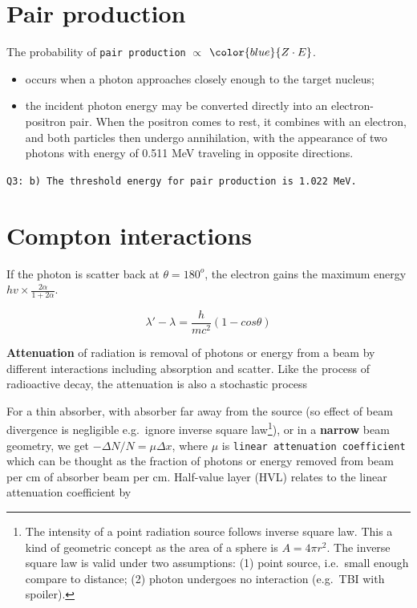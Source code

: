 \documentclass[]{book}
\providecommand{\tightlist}{%
  \setlength{\itemsep}{0pt}\setlength{\parskip}{0pt}}
\let\rmarkdownfootnote\footnote%
\def\footnote{\protect\rmarkdownfootnote}
\theoremstyle{definition}
\theoremstyle{definition}
\theoremstyle{definition}
\theoremstyle{remark}
\begin{document}
\section{Pair production}\label{pair}

The probability of \texttt{pair\ production} \(\propto\)
\(\color{blue} {Z\cdot E}\).

\begin{itemize}
\tightlist
\item
  occurs when a photon approaches closely enough to the target nucleus;
\item
  the incident photon energy may be converted directly into an
  electron-positron pair. When the positron comes to rest, it combines
  with an electron, and both particles then undergo annihilation, with
  the appearance of two photons with energy of 0.511 MeV traveling in
  opposite directions.
\end{itemize}

\texttt{Q3:\ b)\ The\ threshold\ energy\ for\ pair\ production\ is\ 1.022\ MeV.}

\section{Compton interactions}\label{compton-interactions}

If the photon is scatter back at \(\theta = 180^o\), the electron gains
the maximum energy \(hv \times \frac{2\alpha}{1+2\alpha}\).

\begin{equation}
    \lambda'-\lambda = \frac{h}{mc^2}(1-cos\theta)
\end{equation}

\textbf{Attenuation} of radiation is removal of photons or energy from a
beam by different interactions including absorption and scatter. Like
the process of radioactive decay, the attenuation is also a stochastic
process

For a thin absorber, with absorber far away from the source (so effect
of beam divergence is negligible e.g.~ignore inverse square
law\footnote{The intensity of a point radiation source follows inverse
  square law. This a kind of geometric concept as the area of a sphere
  is \(A = 4\pi r^2\). The inverse square law is valid under two
  assumptions: (1) point source, i.e.~small enough compare to distance;
  (2) photon undergoes no interaction (e.g.~TBI with spoiler).}), or in
a \textbf{narrow} beam geometry, we get \(-\Delta N/N = \mu \Delta x\),
where \(\mu\) is \texttt{linear\ attenuation\ coefficient} which can be
thought as the fraction of photons or energy removed from beam per cm of
absorber beam per cm. Half-value layer (HVL) relates to the linear
attenuation coefficient by
\end{document}
